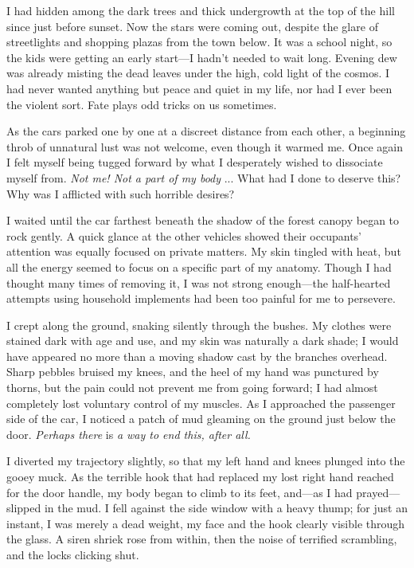 I had hidden among the dark trees and thick undergrowth at the top of
the hill since just before sunset. Now the stars were coming out,
despite the glare of streetlights and shopping plazas from the town
below. It was a school night, so the kids were getting an early
start---I hadn't needed to wait long. Evening dew was already misting
the dead leaves under the high, cold light of the cosmos. I had never
wanted anything but peace and quiet in my life, nor had I ever been the
violent sort. Fate plays odd tricks on us sometimes.

As the cars parked one by one at a discreet distance from each other, a
beginning throb of unnatural lust was not welcome, even though it warmed
me. Once again I felt myself being tugged forward by what I desperately
wished to dissociate myself from. \emph{Not me! Not a part of my body}
... What had I done to deserve this? Why was I afflicted with such
horrible desires?

I waited until the car farthest beneath the shadow of the forest canopy
began to rock gently. A quick glance at the other vehicles showed their
occupants' attention was equally focused on private matters. My skin
tingled with heat, but all the energy seemed to focus on a specific part
of my anatomy. Though I had thought many times of removing it, I was not
strong enough---the half-hearted attempts using household implements had
been too painful for me to persevere.

I crept along the ground, snaking silently through the bushes. My
clothes were stained dark with age and use, and my skin was naturally a
dark shade; I would have appeared no more than a moving shadow cast by
the branches overhead. Sharp pebbles bruised my knees, and the heel of
my hand was punctured by thorns, but the pain could not prevent me from
going forward; I had almost completely lost voluntary control of my
muscles. As I approached the passenger side of the car, I noticed a
patch of mud gleaming on the ground just below the door. \emph{Perhaps
there} is \emph{a way to end this, after all.}

I diverted my trajectory slightly, so that my left hand and knees
plunged into the gooey muck. As the terrible hook that had replaced my
lost right hand reached for the door handle, my body began to climb to
its feet, and---as I had prayed---slipped in the mud. I fell against the
side window with a heavy thump; for just an instant, I was merely a dead
weight, my face and the hook clearly visible through the glass. A siren
shriek rose from within, then the noise of terrified scrambling, and the
locks clicking shut.


